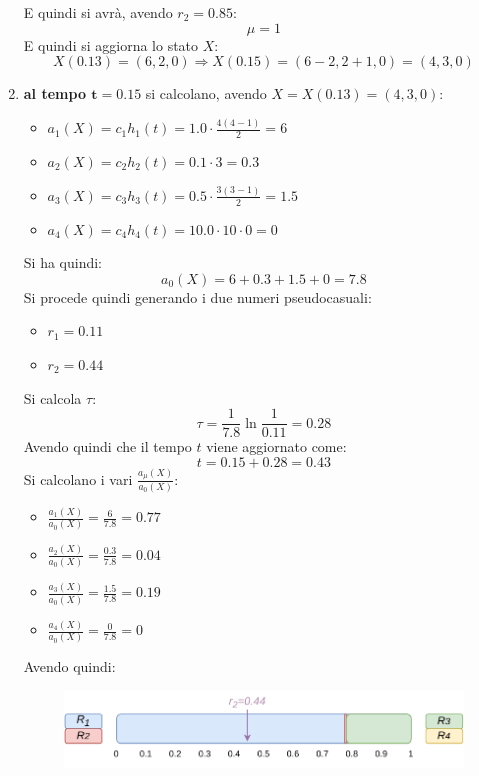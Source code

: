 \documentclass{article}
\begin{document}
\begin{enumerate}[label=\roman*)]
\begin{figure}[H]
  \end{figure}
  E quindi si avrà, avendo $r_2=0.85$:
  \[\mu=1\]
  E quindi si aggiorna lo stato $X$:
  \[X(0.13) = (6,2,0) \Rightarrow X(0.15) = (6-2,2+1,0) = (4,3,0)\]
  \newpage
  \item \textbf{al tempo $\mathbf{t=0.15}$} si calcolano, avendo
  $X=X(0.13)=(4,3,0)$: 
  \begin{multicols}{2}
    \begin{itemize}
      \item $a_1(X)=c_1h_1(t)=1.0\cdot\frac{4(4-1)}{2}=6$
      \item $a_2(X)=c_2h_2(t)=0.1\cdot 3=0.3$
      \item $a_3(X)=c_3h_3(t)=0.5\cdot \frac{3(3-1)}{2}=1.5$
      \item $a_4(X)=c_4h_4(t)=10.0\cdot 10 \cdot 0=0$
    \end{itemize}
  \end{multicols}
  Si ha quindi:
  \[a_0(X)=6+0.3+1.5+0=7.8\]
  Si procede quindi generando i due numeri pseudocasuali:
  \begin{multicols}{2}
    \begin{itemize}
      \item $r_1=0.11$
      \item $r_2=0.44$
    \end{itemize}
  \end{multicols}
  Si calcola $\tau$:
  \[\tau=\frac{1}{7.8}\ln\frac{1}{0.11}=0.28\]
  Avendo quindi che il tempo $t$ viene aggiornato come:
  \[t=0.15+0.28=0.43\]
  Si calcolano i vari $\frac{a_\mu(X)}{a_0(X)}$:
  \begin{multicols}{2}
    \begin{itemize}
      \item $\frac{a_1(X)}{a_0(X)}=\frac{6}{7.8}=0.77$
      \item $\frac{a_2(X)}{a_0(X)}=\frac{0.3}{7.8}=0.04$
      \item $\frac{a_3(X)}{a_0(X)}=\frac{1.5}{7.8}=0.19$
      \item $\frac{a_4(X)}{a_0(X)}=\frac{0}{7.8}=0$
    \end{itemize}
  \end{multicols}
  Avendo quindi:
  \begin{figure}[H]
    \centering
    \includegraphics[scale = 0.8]{img/t4.pdf}

\end{figure}
\end{enumerate}
\end{document}
